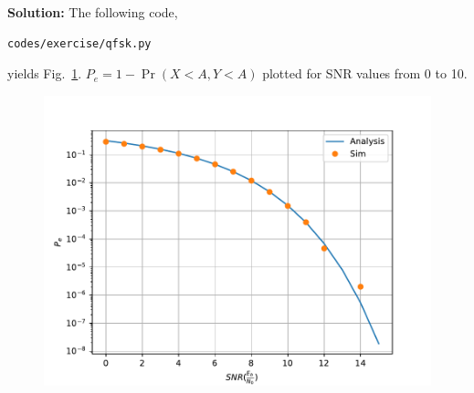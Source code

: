 \documentclass[journal,8pt,onecolumn]{IEEEtran}
\newcommand\figref{Fig.~\ref}
\providecommand{\pr}[1]{\ensuremath{\Pr\left(#1\right)}}
\newcommand{\solution}{\noindent \textbf{Solution: }}
\begin{document}
\begin{enumerate}
\begin{enumerate}[label=(\alph{enumii})]
\solution 
The following code,
\begin{lstlisting}
codes/exercise/qfsk.py
\end{lstlisting}
yields \figref{fig:qpsk_ber}. $P_e = 1-\pr{X<A,Y<A}$ plotted for SNR values from 0 to 10.
\begin{figure}[H]
\centering
\includegraphics[width=\columnwidth/2]{./figs/qpsk_ber.pdf}
\caption{}
\label{fig:qpsk_ber}
\end{figure}
\end{enumerate}
\end{enumerate}
\end{document}
